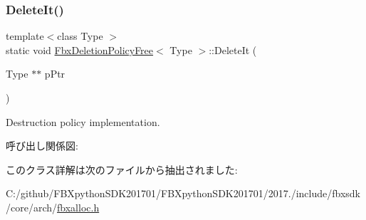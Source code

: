 \subsubsection{\texorpdfstring{Delete\+It()}{DeleteIt()}}
{\footnotesize\ttfamily template$<$class Type $>$ \\
static void \hyperlink{class_fbx_deletion_policy_free}{Fbx\+Deletion\+Policy\+Free}$<$ Type $>$\+::Delete\+It (\begin{DoxyParamCaption}\item[{Type $\ast$$\ast$}]{p\+Ptr }\end{DoxyParamCaption})\hspace{0.3cm}{\ttfamily [static]}}



Destruction policy implementation. 

呼び出し関係図\+:


このクラス詳解は次のファイルから抽出されました\+:\begin{DoxyCompactItemize}
\item 
C\+:/github/\+F\+B\+Xpython\+S\+D\+K201701/\+F\+B\+Xpython\+S\+D\+K201701/2017./include/fbxsdk/core/arch/\hyperlink{fbxalloc_8h}{fbxalloc.\+h}\end{DoxyCompactItemize}
